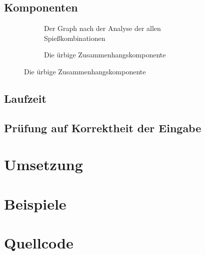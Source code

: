 \documentclass[a4paper,10pt,ngerman]{scrartcl}
\begin{document}
\subsection{Komponenten}

\begin{figure}[h]
\centering
\begin{subfigure}[c]{.49\textwidth}
\centering

\caption{Der Graph nach der Analyse der allen Spießkombinationen}
\label{fig:graph-after-infos}
\end{subfigure}
\begin{subfigure}[c]{.49\textwidth}
\centering

\caption{Die ürbige Zusammenhangskomponente}
\label{fig:component-left}
\end{subfigure}
\end{figure}

\subsection{Laufzeit}
\subsection{Prüfung auf Korrektheit der Eingabe}

\section{Umsetzung}\label{sec:umsetzung}

\section{Beispiele}










\section{Quellcode}

\end{document}
